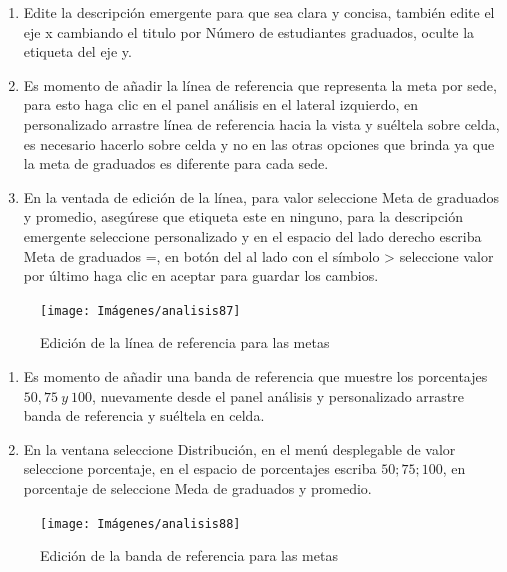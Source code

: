\documentclass[
]{book}
\begin{document}
\begin{enumerate}
\def\labelenumi{\arabic{enumi}.}
\setcounter{enumi}{3}
\item
  Edite la descripción emergente para que sea clara y concisa, también edite el eje x cambiando el titulo por Número de estudiantes graduados, oculte la etiqueta del eje y.
\item
  Es momento de añadir la línea de referencia que representa la meta por sede, para esto haga clic en el panel análisis en el lateral izquierdo, en personalizado arrastre línea de referencia hacia la vista y suéltela sobre celda, es necesario hacerlo sobre celda y no en las otras opciones que brinda ya que la meta de graduados es diferente para cada sede.
\item
  En la ventada de edición de la línea, para valor seleccione Meta de graduados y promedio, asegúrese que etiqueta este en ninguno, para la descripción emergente seleccione personalizado y en el espacio del lado derecho escriba Meta de graduados =, en botón del al lado con el símbolo \textgreater{} seleccione valor por último haga clic en aceptar para guardar los cambios.
\end{enumerate}

\begin{figure}

{\centering \texttt{[image: Imágenes/analisis87]} 

}

\caption{Edición de la línea de referencia para las metas}\label{fig:paso6graficobala-fig}
\end{figure}

\begin{enumerate}
\def\labelenumi{\arabic{enumi}.}
\setcounter{enumi}{6}
\item
  Es momento de añadir una banda de referencia que muestre los porcentajes \(50, 75 ~ y ~100\), nuevamente desde el panel análisis y personalizado arrastre banda de referencia y suéltela en celda.
\item
  En la ventana seleccione Distribución, en el menú desplegable de valor seleccione porcentaje, en el espacio de porcentajes escriba \(50;75;100\), en porcentaje de seleccione Meda de graduados y promedio.
\end{enumerate}

\begin{figure}

{\centering \texttt{[image: Imágenes/analisis88]} 

}

\caption{Edición de la banda de referencia para las metas}\label{fig:paso8graficobala-fig}
\end{figure}
\end{document}
